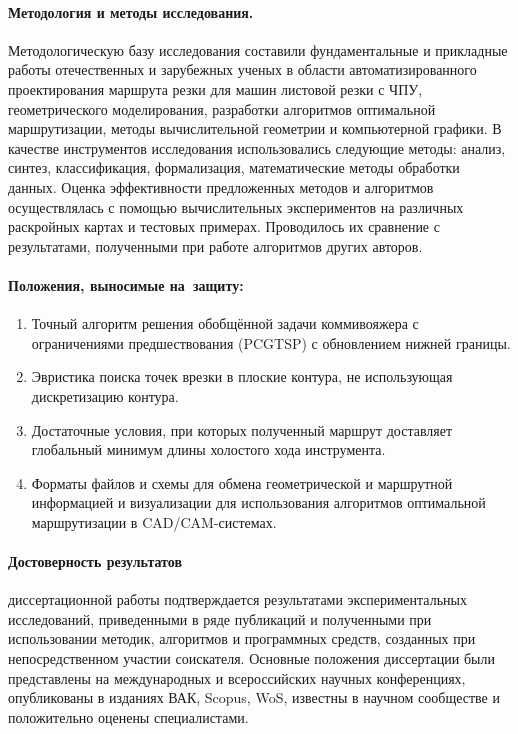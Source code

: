 \paragraph*{Методология и методы исследования.}

Методологическую базу исследования составили
фундаментальные и прикладные работы отечественных и зарубежных ученых
в области автоматизированного проектирования маршрута резки для машин листовой резки с ЧПУ,
геометрического моделирования,
разработки алгоритмов оптимальной маршрутизации,
методы вычислительной геометрии и компьютерной графики.
В качестве инструментов исследования использовались следующие методы:
анализ, синтез, классификация, формализация, математические методы обработки данных.
Оценка эффективности предложенных
методов и алгоритмов осуществлялась с помощью вычислительных экспериментов
на различных раскройных картах и тестовых примерах.
Проводилось их сравнение с результатами,
полученными при работе алгоритмов
других авторов.

\paragraph*{Положения, выносимые на~защиту:}

\begin{enumerate}
  \item
    Точный алгоритм решения обобщённой задачи коммивояжера
    с ограничениями предшествования
    (PCGTSP)
    с обновлением нижней границы.
  \item
    Эвристика поиска точек врезки в плоские контура,
    не использующая дискретизацию контура.
  \item
    Достаточные условия, при которых полученный маршрут
    доставляет глобальный минимум длины холостого хода инструмента.
  \item
    Форматы файлов и схемы для обмена геометрической и маршрутной информацией
    и визуализации для использования алгоритмов оптимальной маршрутизации
    в CAD/CAM-системах.
\end{enumerate}

\paragraph*{Достоверность результатов}
диссертационной работы подтверждается результатами экспериментальных исследований,
приведенными в ряде публикаций и полученными при использовании методик, алгоритмов и программных средств,
созданных при непосредственном участии соискателя.
Основные положения диссертации были представлены на международных и всероссийских научных конференциях,
опубликованы в изданиях ВАК, Scopus, WoS,
известны в научном сообществе и положительно оценены специалистами.

